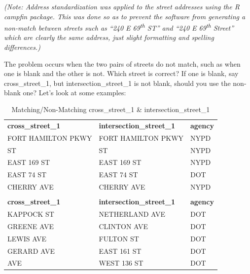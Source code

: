 \documentclass[12pt, titlepage]{article}
\begin{document}
{\textit{(Note: Address standardization was applied to the street addresses using the R \emph{campfin} package. 
This was done so as to prevent the software from generating a non-match between 
streets such as ``240 E 69\textsuperscript{th} ST'' and ``240 E 69\textsuperscript{th} Street'' 
which are clearly the same address, just slight formatting and spelling differences.)}

The problem occurs when the two pairs of streets do not match, such as when one is blank and the
other is not. Which street is correct? If one is blank, say cross\_street\_1, but  intersection\_street\_1
is not blank, should you use the non-blank one?  Let's look at some examples:

\begin{table}[tbp]
    \centering
     \caption{Matching/Non-Matching cross\_street\_1 \& intersection\_street\_1}
    \normalsize
    \begin{tabular}{>{\normalsize\ttfamily}l >{\normalsize\ttfamily}l >{\normalsize\ttfamily}l}
        \toprule
        \multicolumn{3}{c}{\textbf{Matching cross\_street\_1 and intersection\_street\_1}} \\
        \midrule
        \textbf{cross\_street\_1} & \textbf{intersection\_street\_1} & \textbf{agency} \\
        \midrule
        FORT HAMILTON PKWY & FORT HAMILTON PKWY & NYPD \\
        87 ST              & 87 ST              & NYPD \\
        EAST 169 ST        & EAST 169 ST        & NYPD \\
        EAST 74 ST         & EAST 74 ST         & DOT  \\
        CHERRY AVE         & CHERRY AVE         & NYPD \\
        \midrule
        \multicolumn{3}{c}{\textbf{Non-matching cross\_street\_1 and intersection\_street\_1}} \\
        \midrule
        \textbf{cross\_street\_1} & \textbf{intersection\_street\_1} & \textbf{agency} \\
        \midrule
        KAPPOCK ST     & NETHERLAND AVE   & DOT \\
        GREENE AVE     & CLINTON AVE      & DOT \\
        LEWIS AVE      & FULTON ST        & DOT \\
        GERARD AVE     & EAST 161 ST      & DOT \\
        8 AVE          & WEST 136 ST      & DOT \\
        \bottomrule
    \end{tabular}
    \label{tab:streets1}
\end{table}

}
\end{document}
